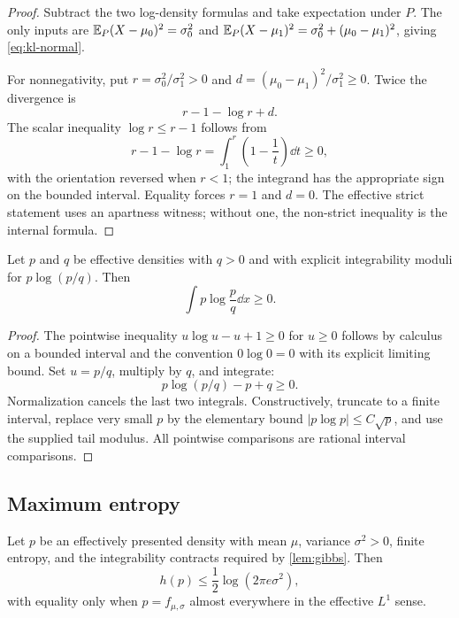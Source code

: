 \begin{proof}
Subtract the two log-density formulas and take expectation under $P$.  The only inputs are
$\mathbb E_P(X-\mu_0)^2=\sigma_0^2$ and
$\mathbb E_P(X-\mu_1)^2=\sigma_0^2+(\mu_0-\mu_1)^2$, giving \eqref{eq:kl-normal}.

For nonnegativity, put $r=\sigma_0^2/\sigma_1^2>0$ and $d=(\mu_0-\mu_1)^2/\sigma_1^2\ge0$.  Twice the divergence is
\[
 r-1-\log r+d.
\]
The scalar inequality $\log r\le r-1$ follows from
\[
 r-1-\log r=\int_1^r\left(1-\frac1t\right)\dd t\ge0,
\]
with the orientation reversed when $r<1$; the integrand has the appropriate sign on the bounded interval.  Equality forces $r=1$ and $d=0$.  The effective strict statement uses an apartness witness; without one, the non-strict inequality is the internal formula.
\end{proof}

\begin{lemma}\label{lem:gibbs}
Let $p$ and $q$ be effective densities with $q>0$ and with explicit integrability moduli for $p\log(p/q)$.  Then
\[
 \int p\log\frac pq\dd x\ge0.
\]
\end{lemma}

\begin{proof}
The pointwise inequality $u\log u-u+1\ge0$ for $u\ge0$ follows by calculus on a bounded interval and the convention $0\log0=0$ with its explicit limiting bound.  Set $u=p/q$, multiply by $q$, and integrate:
\[
 p\log(p/q)-p+q\ge0.
\]
Normalization cancels the last two integrals.  Constructively, truncate to a finite interval, replace very small $p$ by the elementary bound $|p\log p|\le C\sqrt p$, and use the supplied tail modulus.  All pointwise comparisons are rational interval comparisons.
\end{proof}

\subsection{Maximum entropy}

\begin{theorem}\label{thm:max-entropy}
Let $p$ be an effectively presented density with mean $\mu$, variance $\sigma^2>0$, finite entropy, and the integrability contracts required by \cref{lem:gibbs}.  Then
\begin{equation}\label{eq:max-entropy}
 h(p)\le\frac12\log(2\pi e\sigma^2),
\end{equation}
with equality only when $p=f_{\mu,\sigma}$ almost everywhere in the effective $L^1$ sense.
\end{theorem}

